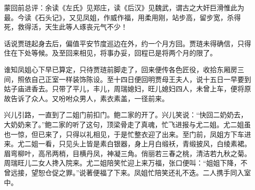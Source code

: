 \begin{parag}
    \begin{note}蒙回前总评：余读《左氏》见郑庄，读《后汉》见魏武，谓古之大奸巨滑惟此为最。今读《石头记》，又见凤姐，作威作福，用柔用刚，站步高，留步宽，杀得死，救得活，天生此等人琢丧元气不少！\end{note}
\end{parag}


\begin{parag}
    话说贾琏起身去后，偏值平安节度巡边在外，约一个月方回。贾琏未得确信，只得住在下处等候。及至回来相见，将事办妥，回程已是将两个月的限了。
\end{parag}


\begin{parag}
    谁知凤姐心下早已算定，只待贾琏前脚走了，回来便传各色匠役，收拾东厢房三间，照依自己正室一样装饰陈设。至十四日便回明贾母王夫人，说十五日一早要到姑子庙进香去。只带了平儿，丰儿，周瑞媳妇，旺儿媳妇四人，未曾上车，便将原故告诉了众人。又吩咐众男人，素衣素盖，一径前来。
\end{parag}


\begin{parag}
    兴儿引路，一直到了二姐门前扣门。鲍二家的开了。兴儿笑说：“快回二奶奶去，大奶奶来了。”鲍二家的听了这句，顶梁骨走了真魂，忙飞进报与尤二姐。尤二姐虽也一惊，但已来了，只得以礼相见，于是忙整衣迎了出来。至门前，凤姐方下车进来。尤二姐一看，只见头上皆是素白银器，身上月白缎袄，青缎披风，白绫素裙。眉弯柳叶，高吊两梢，目横丹凤，神凝三角。俏丽若三春之桃，清洁若九秋之菊。周瑞旺儿二女人搀入院来。尤二姐陪笑忙迎上来万福，张口便叫：“姐姐下降，不曾远接，望恕仓促之罪。”说著便福了下来。凤姐忙陪笑还礼不迭。二人携手同入室中。
\end{parag}


